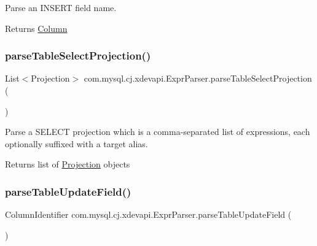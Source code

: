 Parse an I\+N\+S\+E\+RT field name.

\begin{DoxyReturn}{Returns}
\mbox{\hyperlink{interfacecom_1_1mysql_1_1cj_1_1xdevapi_1_1_column}{Column}} 
\end{DoxyReturn}
\mbox{\label{classcom_1_1mysql_1_1cj_1_1xdevapi_1_1_expr_parser_a236fa3f356e511f04e6dfb64a333b354}} 
\subsubsection{\texorpdfstring{parse\+Table\+Select\+Projection()}{parseTableSelectProjection()}}
{\footnotesize\ttfamily List$<$Projection$>$ com.\+mysql.\+cj.\+xdevapi.\+Expr\+Parser.\+parse\+Table\+Select\+Projection (\begin{DoxyParamCaption}{ }\end{DoxyParamCaption})}

Parse a S\+E\+L\+E\+CT projection which is a comma-\/separated list of expressions, each optionally suffixed with a target alias.

\begin{DoxyReturn}{Returns}
list of \mbox{\hyperlink{}{Projection}} objects 
\end{DoxyReturn}
\mbox{\label{classcom_1_1mysql_1_1cj_1_1xdevapi_1_1_expr_parser_ab2e27d666920b2b5e2985b98a7c658d7}} 
\subsubsection{\texorpdfstring{parse\+Table\+Update\+Field()}{parseTableUpdateField()}}
{\footnotesize\ttfamily Column\+Identifier com.\+mysql.\+cj.\+xdevapi.\+Expr\+Parser.\+parse\+Table\+Update\+Field (\begin{DoxyParamCaption}{ }\end{DoxyParamCaption})}

